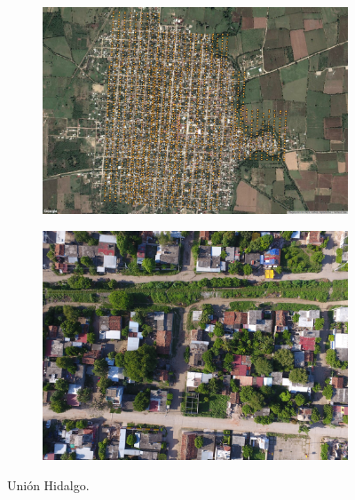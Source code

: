 \begin{figure}[!h]
  \centering
    \begin{subfigure}{.8\textwidth}
        \includegraphics[width=\textwidth]{images/union-satellite.jpg}
    \end{subfigure}
    \begin{subfigure}{.8\textwidth}
        \includegraphics[width=\textwidth]{images/union-sample.jpg}
    \end{subfigure}
  \caption{Uni\'on Hidalgo.}
  \label{fig:union}
\end{figure}

